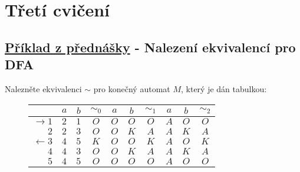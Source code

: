 \section{Třetí cvičení}

\subsection{\href{https://youtu.be/sA8ZXlhjbIo?list=PLQL6z4JeTTQkLuzI78OTnfYBclE1g0UjS&t=712}{Příklad z přednášky} - Nalezení ekvivalencí pro DFA}

Nalezněte ekvivalenci $\sim$ pro konečný automat $M$, který je dán tabulkou:

\begin{figure}[H]
    \begin{minipage}[c]{0.5\textwidth}
        \begin{tabular}{|r|c c|c|c c|c|c c|c|}
            \hline
            & $a$ & $b$ & $\sim_0$ & $a$ & $b$ & $\sim_1$ & $a$ & $b$ & $\sim_2$ \\ \hline \hline
            $\rightarrow 1$& $2$ & $1$ & $O$ & $O$ & $O$ & $O$ & $A$ & $O$ & $O$ \\
            $2$            & $2$ & $3$ & $O$ & $O$ & $K$ & $A$ & $A$ & $K$ & $A$ \\
            $\leftarrow 3$ & $4$ & $5$ & $K$ & $O$ & $O$ & $K$ & $A$ & $O$ & $K$ \\
            $4$            & $4$ & $3$ & $O$ & $O$ & $K$ & $A$ & $A$ & $K$ & $A$ \\
            $5$            & $4$ & $5$ & $O$ & $O$ & $O$ & $O$ & $A$ & $O$ & $O$ \\
            \hline
        \end{tabular}
    \end{minipage}%
    \begin{minipage}[c]{0.48\textwidth}
    \end{minipage}
\end{figure}


